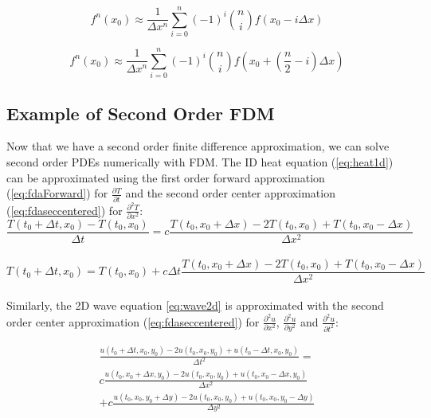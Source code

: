 { \begin{equation}\label{eq:generalFDABackward}
 f^{n}(x_{0}) \approx \frac{1}{\Delta  x^{n}}\sum_{i=0}^{n}(-1)^{i}\binom {n} {i}f(x_{0} - i\Delta  x)
 \end{equation}
 
  \begin{equation}\label{eq:generalFDACenter}
 f^{n}(x_{0}) \approx \frac{1}{\Delta  x^{n}}\sum_{i=0}^{n}(-1)^{i}\binom {n} {i}f(x_{0} + \left(\frac{n}{2}-i\right)\Delta  x)
 \end{equation}
 
\subsection{Example of Second Order FDM}

Now that we have a second order finite difference approximation, we can solve second order PDEs numerically with FDM.  The ID heat equation (\ref{eq:heat1d}) can be approximated using the first order forward approximation (\ref{eq:fdaForward}) for $\frac{\partial T}{\partial t}$ and the second order center approximation (\ref{eq:fdaseccentered}) for $\frac{\partial^{2} T}{\partial x^{2}}$:\\

 \begin{equation}
  \frac{T(t_{0} + \Delta  t, x_{0}) - T(t_{0}, x_{0})}{\Delta  t} = c\frac{T(t_{0},x_{0} + \Delta  x)- 2T(t_{0},x_{0}) + T(t_{0},x_{0} -\Delta  x)}{\Delta  x^{2}}
  \end{equation}
\\
 \begin{equation}\label{eq:heatfda1D}
  T(t_{0} + \Delta  t, x_{0}) = T(t_{0}, x_{0}) + c\Delta  t\frac{T(t_{0},x_{0} + \Delta  x) - 2T(t_{0},x_{0}) + T(t_{0},x_{0} -\Delta  x)}{\Delta  x^{2}}
  \end{equation}
\\
Similarly, the 2D wave equation \ref{eq:wave2d} is approximated with the second order center approximation (\ref{eq:fdaseccentered}) for $\frac{\partial^{2} u}{\partial x^{2}}$, $\frac{\partial^{2} u}{\partial y^{2}}$ and $\frac{\partial^{2} u}{\partial t^{2}}$:

 \begin{multline}
\frac{u(t_{0} + \Delta  t,x_{0},y_{0})- 2u(t_{0},x_{0},y_{0}) + u(t_{0} -\Delta  t,x_{0},y_{0})}{\Delta  t^{2}} = \\
c\frac{u(t_{0},x_{0} + \Delta  x,y_{0})- 2u(t_{0},x_{0},y_{0}) + u(t_{0},x_{0} -\Delta  x,y_{0})}{\Delta  x^{2}}\\
+c\frac{u(t_{0},x_{0},y_{0}+ \Delta  y)- 2u(t_{0},x_{0},y_{0}) + u(t_{0},x_{0},y_{0} -\Delta  y)}{\Delta  y^{2}}
  \end{multline}
  
}
